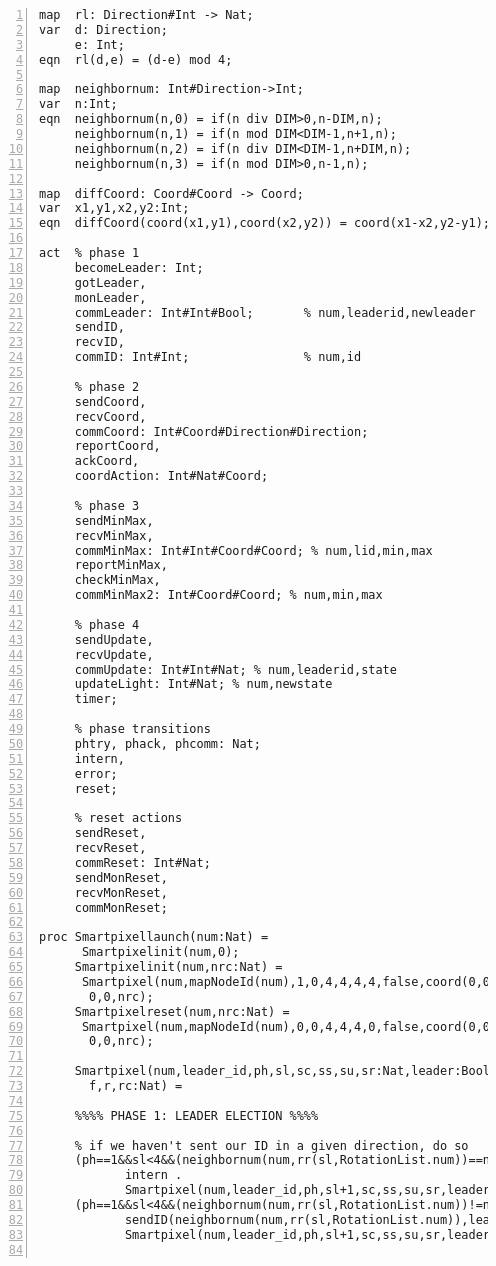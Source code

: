 \begin{Verbatim}[frame=lines,numbers=left,fontfamily=courier,fontsize=\footnotesize]
map  rl: Direction#Int -> Nat;
var  d: Direction;
     e: Int;
eqn  rl(d,e) = (d-e) mod 4;

map  neighbornum: Int#Direction->Int;
var  n:Int;
eqn  neighbornum(n,0) = if(n div DIM>0,n-DIM,n);
     neighbornum(n,1) = if(n mod DIM<DIM-1,n+1,n);
     neighbornum(n,2) = if(n div DIM<DIM-1,n+DIM,n);
     neighbornum(n,3) = if(n mod DIM>0,n-1,n);

map  diffCoord: Coord#Coord -> Coord;
var  x1,y1,x2,y2:Int;
eqn  diffCoord(coord(x1,y1),coord(x2,y2)) = coord(x1-x2,y2-y1);

act  % phase 1
     becomeLeader: Int;
     gotLeader,
     monLeader,
     commLeader: Int#Int#Bool;       % num,leaderid,newleader
     sendID,
     recvID,
     commID: Int#Int;                % num,id

     % phase 2
     sendCoord,
     recvCoord,
     commCoord: Int#Coord#Direction#Direction;
     reportCoord,
     ackCoord,
     coordAction: Int#Nat#Coord;

     % phase 3
     sendMinMax,
     recvMinMax,
     commMinMax: Int#Int#Coord#Coord; % num,lid,min,max
     reportMinMax,
     checkMinMax,
     commMinMax2: Int#Coord#Coord; % num,min,max

     % phase 4
     sendUpdate,
     recvUpdate,
     commUpdate: Int#Int#Nat; % num,leaderid,state
     updateLight: Int#Nat; % num,newstate
     timer;

     % phase transitions
     phtry, phack, phcomm: Nat;
     intern,
     error;
     reset;

     % reset actions
     sendReset,
     recvReset,
     commReset: Int#Nat;
     sendMonReset,
     recvMonReset,
     commMonReset;

proc Smartpixellaunch(num:Nat) =
      Smartpixelinit(num,0);
     Smartpixelinit(num,nrc:Nat) =
      Smartpixel(num,mapNodeId(num),1,0,4,4,4,4,false,coord(0,0),coord(0,0),coord(0,0),
       0,0,nrc);
     Smartpixelreset(num,nrc:Nat) =
      Smartpixel(num,mapNodeId(num),0,0,4,4,4,0,false,coord(0,0),coord(0,0),coord(0,0),
       0,0,nrc);

     Smartpixel(num,leader_id,ph,sl,sc,ss,su,sr:Nat,leader:Bool,log,mincd,maxcd:Coord,
       f,r,rc:Nat) =
      
     %%%% PHASE 1: LEADER ELECTION %%%%

     % if we haven't sent our ID in a given direction, do so
     (ph==1&&sl<4&&(neighbornum(num,rr(sl,RotationList.num))==num)) ->
            intern .
            Smartpixel(num,leader_id,ph,sl+1,sc,ss,su,sr,leader,log,mincd,maxcd,f,r,rc) +
     (ph==1&&sl<4&&(neighbornum(num,rr(sl,RotationList.num))!=num)) ->
            sendID(neighbornum(num,rr(sl,RotationList.num)),leader_id) .
            Smartpixel(num,leader_id,ph,sl+1,sc,ss,su,sr,leader,log,mincd,maxcd,f,r,rc) +


\end{Verbatim}
